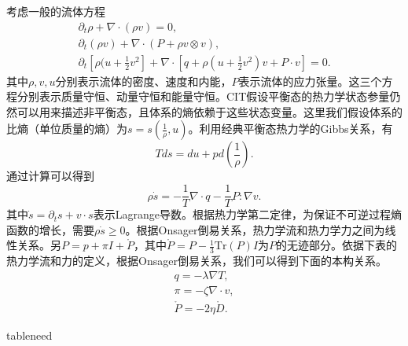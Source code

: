 \documentclass{article}
\begin{document}
考虑一般的流体方程
\begin{subequations}
	\begin{align}
		\partial_t \rho + \nabla \cdot (\rho v) = 0 ,\\
		\partial_t (\rho v) + \nabla \cdot (P + \rho v \otimes v), \\
		\partial_t[\rho (u + \frac{1}{2} v^2] + \nabla \cdot [q + \rho (u+\frac{1}{2}v^2) v + P \cdot v] = 0.
	\end{align}
\end{subequations}
其中$\rho,v,u$分别表示流体的密度、速度和内能，$P$表示流体的应力张量。这三个方程分别表示质量守恒、动量守恒和能量守恒。CIT假设平衡态的热力学状态参量仍然可以用来描述非平衡态，且体系的熵依赖于这些状态变量。这里我们假设体系的比熵（单位质量的熵）为$s=s(\frac{1}{\rho},u)$。利用经典平衡态热力学的Gibbs关系，有
\begin{equation*}
	T ds = du + p d(\frac{1}{\rho}).
\end{equation*}
通过计算可以得到
\begin{equation*}
	\rho \dot{s} = - \frac{1}{T} \nabla \cdot q - \frac{1}{T} P: \nabla v.
\end{equation*}
其中$\dot{s} = \partial_t s + v \cdot s$表示Lagrange导数。根据热力学第二定律，为保证不可逆过程熵函数的增长，需要$\rho \dot{s} \ge 0 $。根据Onsager倒易关系，热力学流和热力学力之间为线性关系。另$P = p + \pi I + \mathring{P}$，其中$\mathring{P} = P - \frac{1}{3} \mbox{Tr}(P) I$为$P$的无迹部分。依据下表的热力学流和力的定义，根据Onsager倒易关系，我们可以得到下面的本构关系。
\begin{eqnarray*}
	q = -\lambda \nabla T, \\
	\pi =  - \zeta \nabla \cdot v, \\
	\mathring{P} = - 2 \eta \mathring{D}.
\end{eqnarray*}

tableneed
\end{document}
